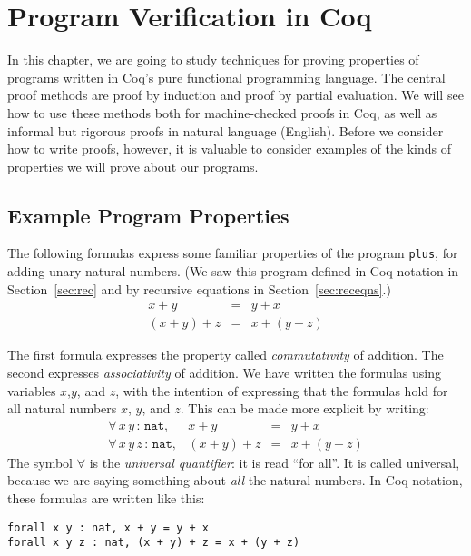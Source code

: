\documentclass{book}[12pt]
\begin{document}
\chapter{Program Verification in Coq}

In this chapter, we are going to study techniques for proving
properties of programs written in Coq's pure functional programming
language.  The central proof methods are proof by induction and proof
by partial evaluation.  We will see how to use these methods both for
machine-checked proofs in Coq, as well as informal but rigorous proofs
in natural language (English).  Before we consider how to write
proofs, however, it is valuable to consider examples of the kinds of
properties we will prove about our programs.

\section{Example Program Properties}

The following formulas express some familiar properties of the program
\texttt{plus}, for adding unary natural numbers.  (We saw this program
defined in Coq notation in Section~\ref{sec:rec} and by recursive equations
in Section~\ref{sec:receqns}.)
\[ 
\begin{array}{lll}
x+y & = & y + x \\
(x+y)+z & = & x+(y+z)
\end{array}
\]

\noindent The first formula expresses the property called
\emph{commutativity} of addition.  The second expresses
\emph{associativity} of addition.  We have written the formulas
using variables $x$,$y$, and $z$, with the intention of expressing
that the formulas hold for all natural numbers $x$, $y$, and $z$.
This can be made more explicit by writing:
\[ 
\begin{array}{llll}
\forall\, x\,y\,:\,\texttt{nat},& x+y & = & y + x \\
\forall\, x\,y\,z\,:\,\texttt{nat}, & (x+y)+z & = & x+(y+z)
\end{array}
\]
\noindent The symbol $\forall$ is the \emph{universal quantifier}:
it is read ``for all''.  It is called universal, because we are
saying something about \emph{all} the natural numbers.  In Coq
notation, these formulas are written like this:

\begin{verbatim}
forall x y : nat, x + y = y + x 
forall x y z : nat, (x + y) + z = x + (y + z)
\end{verbatim}
\end{document}
